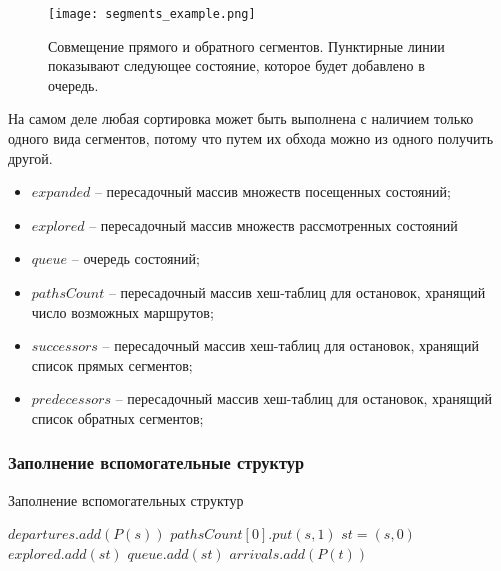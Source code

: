 \begin{figure}[!h]
	\centering
	\texttt{[image: segments\_example.png]}
	\caption{Совмещение прямого и обратного сегментов. Пунктирные линии показывают следующее состояние, которое будет добавлено в очередь.}\label{fig4}
\end{figure}

На самом деле любая сортировка может быть выполнена с наличием только одного вида сегментов, потому что путем их обхода можно из одного получить другой.

\begin{itemize}
		\item $expanded$ -- пересадочный массив множеств посещенных состояний;
		\item $explored$ -- пересадочный массив множеств рассмотренных состояний
		\item $queue$ -- очередь состояний;
		\item $pathsCount$ -- пересадочный массив хеш-таблиц для остановок, хранящий число возможных маршрутов;
		\item $successors$ -- пересадочный массив хеш-таблиц для остановок, хранящий список прямых сегментов;
		\item $predecessors$ -- пересадочный массив хеш-таблиц для остановок, хранящий список обратных сегментов;
\end{itemize}

\subsubsection{Заполнение вспомогательные структур}

\begin{algorithm}[!h]
	\caption{Заполнение вспомогательных структур}\label{lst5}
	\begin{algorithmic}
			\State $departures.add(P(s))$ 
			\State $pathsCount[0].put(s, 1)$ 
			\State $st = (s, 0)$ 
			\State $explored.add(st)$ 
			\State $queue.add(st)$ 
		\EndFor
			\State $arrivals.add(P(t))$ 
		\EndFor
	\end{algorithmic}
\end{algorithm}

